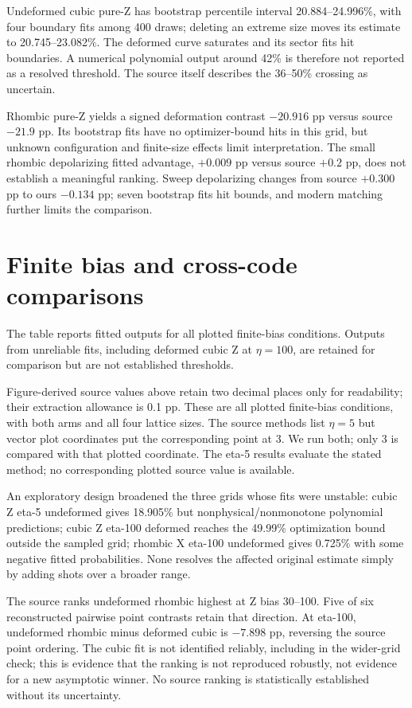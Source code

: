 Undeformed cubic pure-Z has bootstrap percentile interval 20.884--24.996\%, with four boundary fits among 400 draws; deleting an extreme size moves its estimate to 20.745--23.082\%. The deformed curve saturates and its sector fits hit boundaries. A numerical polynomial output around 42\% is therefore not reported as a resolved threshold. The source itself describes the 36--50\% crossing as uncertain.

Rhombic pure-Z yields a signed deformation contrast $-20.916$ pp versus source $-21.9$ pp. Its bootstrap fits have no optimizer-bound hits in this grid, but unknown configuration and finite-size effects limit interpretation. The small rhombic depolarizing fitted advantage, $+0.009$ pp versus source $+0.2$ pp, does not establish a meaningful ranking. Sweep depolarizing changes from source $+0.300$ pp to ours $-0.134$ pp; seven bootstrap fits hit bounds, and modern matching further limits the comparison.

\section{Finite bias and cross-code comparisons}
The table reports fitted outputs for all plotted finite-bias conditions. Outputs from unreliable fits, including deformed cubic Z at $\eta=100$, are retained for comparison but are not established thresholds.

Figure-derived source values above retain two decimal places only for readability; their extraction allowance is 0.1 pp. These are all plotted finite-bias conditions, with both arms and all four lattice sizes. The source methods list $\eta=5$ but vector plot coordinates put the corresponding point at 3. We run both; only 3 is compared with that plotted coordinate. The eta-5 results evaluate the stated method; no corresponding plotted source value is available.

An exploratory design broadened the three grids whose fits were unstable: cubic Z eta-5 undeformed gives 18.905\% but nonphysical/nonmonotone polynomial predictions; cubic Z eta-100 deformed reaches the 49.99\% optimization bound outside the sampled grid; rhombic X eta-100 undeformed gives 0.725\% with some negative fitted probabilities. None resolves the affected original estimate simply by adding shots over a broader range.

The source ranks undeformed rhombic highest at Z bias 30--100. Five of six reconstructed pairwise point contrasts retain that direction. At eta-100, undeformed rhombic minus deformed cubic is $-7.898$ pp, reversing the source point ordering. The cubic fit is not identified reliably, including in the wider-grid check; this is evidence that the ranking is not reproduced robustly, not evidence for a new asymptotic winner. No source ranking is statistically established without its uncertainty.


